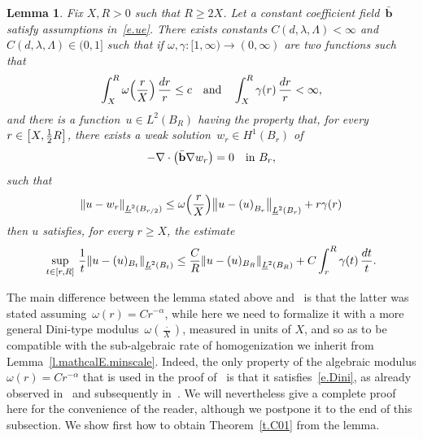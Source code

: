 \documentclass[11pt]{article} %
\numberwithin{equation}{section}
\newtheorem{lemma}[theorem]{Lemma}
\theoremstyle{definition}
\let\originalleft\left
\let\originalright\right
\renewcommand{\left}{\mathopen{}\mathclose\bgroup\originalleft}
\renewcommand{\right}{\aftergroup\egroup\originalright}
\newcommand{\bhom}{\bar{\mathbf{b}}}
\begin{document}
\begin{lemma}
\label{l.harm.approx}
Fix $X,R >0$ such that $R \geq 2X$. Let a constant coefficient field~$\bhom$ satisfy assumptions in~\eqref{e.ue}. There exists constants $C(d,\lambda,\Lambda)<\infty$ and $C(d,\lambda,\Lambda) \in (0,1]$ such that if $\omega,\gamma:[1,\infty) \to (0,\infty)$ are two functions such that 
\begin{equation} 
\label{e.Dini}
\int_{X}^R \omega\Bigl( \frac{r}X \Bigr) \, \frac{dr}{r} \leq c
\quad \mbox{and} \quad \int_{X}^R  \gamma(r)  \, \frac{dr}{r} < \infty,
\end{equation}
and there is a function~$u\in L^2(B_{R})$ having the property that, for every~$r\in \left[ X, \frac12R \right]$, there exists a weak solution~$w_r \in H^1(B_{r})$ of 
\begin{equation*} \label{}
-\nabla \cdot \left( \bhom \nabla w_r \right) = 0 \quad \mbox{in} \ B_{r},
\end{equation*}
such that 
\begin{equation} 
\label{e.wharmapproxit}
\left\| u - w_r \right\|_{\underline{L}^2(B_{r/2})} \leq    
\omega\Bigl( \frac{r}X \Bigr)
\left\| u - \left( u \right)_{B_{r}} \right\|_{\underline{L}^2(B_{r})}  + r \gamma(r) 
\end{equation}
then $u$ satisfies, for every $r \geq X$, the estimate
\begin{equation}
\label{e.elipsc}
\sup_{t \in \left[r, R\right]} \,
\frac1{t} \left\| u - ( u )_{B_{t}} \right\|_{\underline{L}^2(B_{t})}
\leq
\frac{C}{R} \left\| u - ( u )_{B_{R}} \right\|_{\underline{L}^2(B_{R})} 
+ C \int_{r}^R \gamma(t) \, \frac{dt}{t}
.
\end{equation}
\end{lemma}

The main difference between the lemma stated above and~\cite[Lemma 5.1]{AS} is that the latter was stated assuming~$\omega(r)= Cr^{-\alpha}$, while here we need to formalize it with a more general Dini-type modulus~$\omega(\frac \cdot X)$, measured in units of $X$, and so as to be compatible with the sub-algebraic rate of homogenization we inherit from Lemma~\ref{l.mathcalE.minscale}. Indeed,
the only property of the algebraic modulus $\omega(r)= Cr^{-\alpha}$ that is used in the proof of~\cite[Lemma 5.1]{AS} is that it satisfies~\eqref{e.Dini}, as already observed in~\cite[Section 3]{ASh} and subsequently in~\cite{FO}. We will nevertheless give a complete proof here for the convenience of the reader, although we postpone it to the end of this subsection. We show first how to obtain Theorem~\ref{t.C01} from the lemma. 
\end{document}
